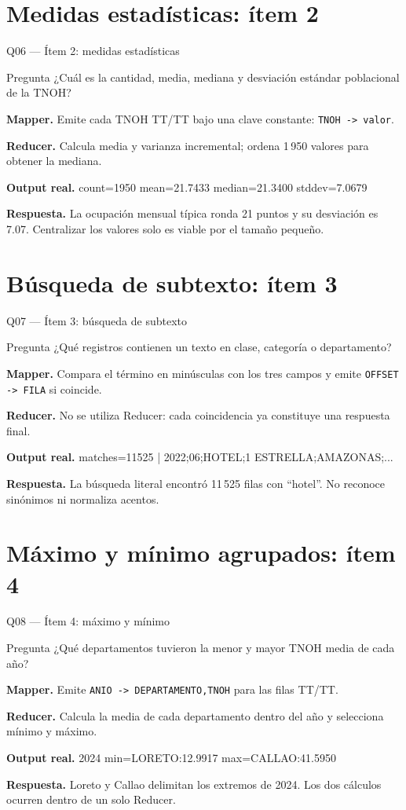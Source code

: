 \documentclass{beamer}
\newcommand{\queryframe}[6]{%
\begin{frame}{#1}
\footnotesize
\begin{alertblock}{Pregunta}
#2
\end{alertblock}
\textbf{Mapper.} #3

\vspace{0.45em}
\textbf{Reducer.} #4

\vspace{0.45em}
\textbf{Output real.} {\ttfamily\scriptsize #5}

\vspace{0.45em}
\textbf{Respuesta.} #6
\end{frame}
}
\begin{document}
\section{Medidas estadísticas: ítem 2}

\queryframe{Q06 — Ítem 2: medidas estadísticas}
{¿Cuál es la cantidad, media, mediana y desviación estándar poblacional de la TNOH?}
{Emite cada TNOH TT/TT bajo una clave constante: \texttt{TNOH -> valor}.}
{Calcula media y varianza incremental; ordena 1\,950 valores para obtener la mediana.}
{count=1950 mean=21.7433 median=21.3400 stddev=7.0679}
{La ocupación mensual típica ronda 21 puntos y su desviación es 7.07. Centralizar los valores solo es viable por el tamaño pequeño.}

\section{Búsqueda de subtexto: ítem 3}

\queryframe{Q07 — Ítem 3: búsqueda de subtexto}
{¿Qué registros contienen un texto en clase, categoría o departamento?}
{Compara el término en minúsculas con los tres campos y emite \texttt{OFFSET -> FILA} si coincide.}
{No se utiliza Reducer: cada coincidencia ya constituye una respuesta final.}
{matches=11525 | 2022;06;HOTEL;1 ESTRELLA;AMAZONAS;...}
{La búsqueda literal encontró 11\,525 filas con ``hotel''. No reconoce sinónimos ni normaliza acentos.}

\section{Máximo y mínimo agrupados: ítem 4}

\queryframe{Q08 — Ítem 4: máximo y mínimo}
{¿Qué departamentos tuvieron la menor y mayor TNOH media de cada año?}
{Emite \texttt{ANIO -> DEPARTAMENTO,TNOH} para las filas TT/TT.}
{Calcula la media de cada departamento dentro del año y selecciona mínimo y máximo.}
{2024 min=LORETO:12.9917 max=CALLAO:41.5950}
{Loreto y Callao delimitan los extremos de 2024. Los dos cálculos ocurren dentro de un solo Reducer.}
\end{document}
